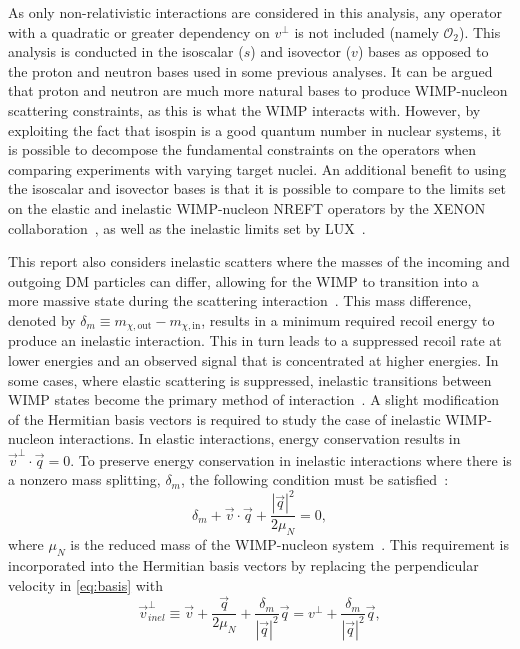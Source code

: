 \documentclass[reprint, showpacs,
preprintnumbers,
amsmath,amssymb,
aps, floatfix,
superscriptaddress,
prd, nofootinbib]{revtex4-1}
\begin{document}
As only non-relativistic interactions are considered in this analysis, any operator with a quadratic or greater dependency on $v^{\perp}$ is not included (namely $\mathcal{O}_2$). 
This analysis is conducted in the isoscalar ($s$) and isovector ($v$) bases as opposed to the proton and neutron bases used in some previous analyses. 
It can be argued that proton and neutron are much more natural bases to produce WIMP-nucleon scattering constraints, as this is what the WIMP interacts with.
However, by exploiting the fact that isospin is a good quantum number in nuclear systems, it is possible to decompose the fundamental constraints on the operators when comparing experiments with varying target nuclei.
An additional benefit to using the isoscalar and isovector bases is that it is possible to compare to the limits set on the elastic and inelastic WIMP-nucleon NREFT operators by the XENON collaboration~\cite{Xenon100:EFT_2017}, as well as the inelastic limits set by LUX~\cite{LUX:EFTR4_2021}.
\par
This report also considers inelastic scatters where the masses of the incoming and outgoing DM particles can differ, allowing for the WIMP to transition into a more massive state during the scattering interaction~\cite{Smith_2001}. 
This mass difference, denoted by $\delta_m \equiv m_{\chi,\mathrm{out}} - m_{\chi,\mathrm{in}}$, results in a minimum required recoil energy to produce an inelastic interaction. This in turn leads to a suppressed recoil rate at lower energies and an observed signal that is concentrated at higher energies. 
In some cases, where elastic scattering is suppressed, inelastic transitions between WIMP states become the primary method of interaction~\cite{Han_1997, Hall_1998}.
A slight modification of the Hermitian basis vectors is required to study the case of inelastic WIMP-nucleon interactions. 
In elastic interactions, energy conservation results in $\vec{v}^{\perp} \cdot \vec{q} = 0$. To preserve energy conservation in inelastic interactions where there is a nonzero mass splitting, $\delta_m$, the following condition must be satisfied~\cite{Barello_2014}:
\begin{equation}\label{eq:massSplitting} 
\delta_m + \vec{v} \cdot \vec{q} +\frac{|\vec{q}|^2}{2\mu_N }= 0, 
\end{equation}
where $\mu_N$ is the reduced mass of the WIMP-nucleon system~\cite{Barello_2014}. 
This requirement is incorporated into the Hermitian basis vectors by replacing the perpendicular velocity in \autoref{eq:basis} with
\begin{equation}\label{eq:idmVelocity} 
\vec{v}^\perp_{inel} \equiv \vec{v} + \frac{\vec{q}}{2\mu_N} + \frac{\delta_m}{|\vec{q}|^2}\vec{q} =v^\perp + \frac{\delta_m}{|\vec{q}|^2}\vec{q}, 
\end{equation}
\end{document}
